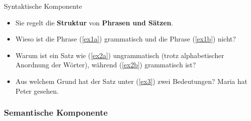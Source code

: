 \begin{frame}{Syntaktische Komponente}

\begin{itemize}
	\item Sie regelt die \textbf{Struktur} von \textbf{Phrasen und Sätzen}.
\pause
\bigskip
	\item[\ra] Wieso ist die Phrase (\ref{ex1a}) grammatisch und die Phrase (\ref{ex1b}) nicht?
	\ea
		\label{ex1a}
		\label{ex1b}
		\z
	\z
\pause
	\item[\ra] Warum ist ein Satz wie (\ref{ex2a}) ungrammatisch (trotz alphabetischer Anordnung der Wörter), während (\ref{ex2b}) grammatisch ist?
	\ea
		\label{ex2a}
		\label{ex2b}
		\z
	\z
\pause	
	\item[\ra] Aus welchem Grund hat der Satz unter (\ref{ex3}) zwei Bedeutungen? 
	\ea
		\ea Maria hat Peter gesehen.\label{ex3}
		\z
	\z
			
\end{itemize}

\end{frame}


\subsubsection{Semantische Komponente}
		
